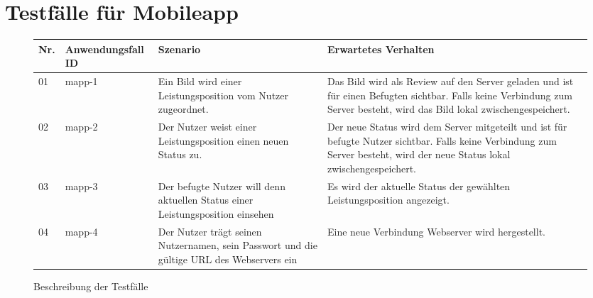 \newpage

\section{Testfälle für Mobileapp}

\begin{figure}[!h]
	\begin{center}
		\begin{tabularx}{\textwidth}{ p{} | p{} | p{} | X }
			\textbf{Nr.} & \textbf{Anwendungsfall ID} & \textbf{Szenario} & \textbf{Erwartetes Verhalten} \\ \hline
			01 & mapp-1 & Ein Bild wird einer Leistungsposition vom Nutzer zugeordnet. & Das Bild wird als Review auf den Server geladen und ist für einen Befugten sichtbar. Falls keine Verbindung zum Server besteht, wird das Bild lokal zwischengespeichert. \\ \hline
			02 & mapp-2 & Der Nutzer weist einer Leistungsposition einen neuen Status zu. & Der neue Status wird dem Server mitgeteilt und ist für befugte Nutzer sichtbar. Falls keine Verbindung zum Server besteht, wird der neue Status lokal zwischengespeichert. \\ \hline
            03 & mapp-3 & Der befugte Nutzer will denn aktuellen Status einer Leistungsposition einsehen & Es wird der aktuelle Status der gewählten Leistungsposition angezeigt. \\ \hline
            04 & mapp-4 & Der Nutzer trägt seinen Nutzernamen, sein Passwort und die gültige URL des Webservers ein & Eine neue Verbindung Webserver wird hergestellt. \\ \hline
		\end{tabularx}	
	\end{center}
	\caption{Beschreibung der Testfälle}
	\label{fig:testfaelle-mobile-app-tabelle}
\end{figure}